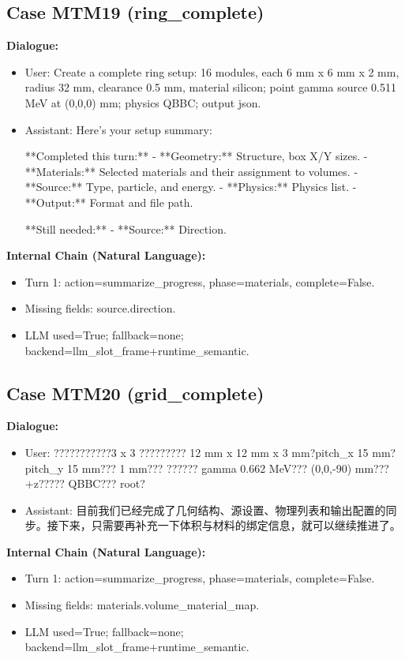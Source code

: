 \documentclass[11pt]{ctexart}
\begin{document}
\subsection{Case MTM19 (ring\_complete)}
\textbf{Dialogue:}
\begin{itemize}
\item User: Create a complete ring setup: 16 modules, each 6 mm x 6 mm x 2 mm, radius 32 mm, clearance 0.5 mm, material silicon; point gamma source 0.511 MeV at (0,0,0) mm; physics QBBC; output json.
\item Assistant: Here's your setup summary:

**Completed this turn:**
- **Geometry:** Structure, box X/Y sizes.
- **Materials:** Selected materials and their assignment to volumes.
- **Source:** Type, particle, and energy.
- **Physics:** Physics list.
- **Output:** Format and file path.

**Still needed:**
- **Source:** Direction.
\end{itemize}
\textbf{Internal Chain (Natural Language):}
\begin{itemize}
\item Turn 1: action=summarize\_progress, phase=materials, complete=False.
\item Missing fields: source.direction.
\item LLM used=True; fallback=none; backend=llm\_slot\_frame+runtime\_semantic.
\end{itemize}
\subsection{Case MTM20 (grid\_complete)}
\textbf{Dialogue:}
\begin{itemize}
\item User: ???????????3 x 3 ????????? 12 mm x 12 mm x 3 mm?pitch\_x 15 mm?pitch\_y 15 mm??? 1 mm??? ?????? gamma 0.662 MeV??? (0,0,-90) mm??? +z????? QBBC??? root?
\item Assistant: 目前我们已经完成了几何结构、源设置、物理列表和输出配置的同步。接下来，只需要再补充一下体积与材料的绑定信息，就可以继续推进了。
\end{itemize}
\textbf{Internal Chain (Natural Language):}
\begin{itemize}
\item Turn 1: action=summarize\_progress, phase=materials, complete=False.
\item Missing fields: materials.volume\_material\_map.
\item LLM used=True; fallback=none; backend=llm\_slot\_frame+runtime\_semantic.
\end{itemize}
\end{document}
